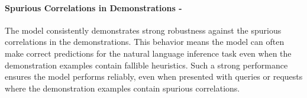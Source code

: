 \paragraph{Spurious Correlations in Demonstrations - \low}
The model consistently demonstrates strong robustness against the spurious correlations in the demonstrations. This behavior means the model can often make correct predictions for the natural language inference task even when the demonstration examples contain fallible heuristics. Such a strong performance ensures the model performs reliably, even when presented with queries or requests where the demonstration examples contain spurious correlations.
